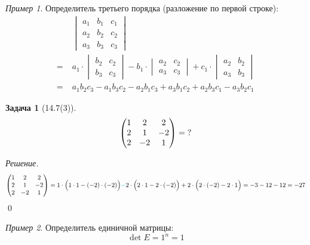 \documentclass[a4paper,12pt]{article}
\newtheorem*{problem}{Задача}
\theoremstyle{definition}
\theoremstyle{remark}
\newtheorem*{example}{Пример}
\theoremstyle{remark}
\begin{document}
  \begin{example}
    Определитель третьего порядка (разложение по первой строке):
    \begin{equation*}
    \begin{split}
      &\begin{vmatrix}
        a_1 & b_1 & c_1\\
        a_2 & b_2 & c_2\\
        a_3 & b_3 & c_3
      \end{vmatrix}\\
        =\; &a_1 \cdot \begin{vmatrix}b_2 & c_2\\b_3 & c_3\end{vmatrix}
        - b_1 \cdot \begin{vmatrix}a_2 & c_2\\a_3 & c_3\end{vmatrix}
        + c_1 \cdot \begin{vmatrix}a_2 & b_2\\a_3 & b_3\end{vmatrix}\\
        =\; &a_1 b_2 c_3 - a_1 b_3 c_2 - a_2 b_1 c_3 + a_3 b_1 c_2 + a_2 b_3 c_1 - a_3 b_2 c_1
    \end{split}
    \end{equation*}
  \end{example}
  
  \begin{problem}[14.7(3)]
    \[
      \begin{pmatrix}
        1 & 2 & 2\\
        2 & 1 & -2\\
        2 & -2 & 1
      \end{pmatrix} = \operatorname{?}
    \]
  \end{problem}
  
  \emph{Решение.}
  \[
    \begin{pmatrix}
      1 & 2 & 2\\
      2 & 1 & -2\\
      2 & -2 & 1
    \end{pmatrix}
    = 1 \cdot \Bigl(1 \cdot 1 - (-2) \cdot (-2)\Bigr)
      \textcolor{cyanL}{-} 2 \cdot \Bigl(2 \cdot 1 - 2 \cdot (-2)\Bigr)
      + 2 \cdot \Bigl(2 \cdot (-2) - 2 \cdot 1\Bigr)
    = -3 - 12 - 12
    = -27
  \]
  \qed
  
  \begin{example}
    Определитель единичной матрицы:
    \[
      \det E = 1^n = 1
    \]
  \end{example}
\end{document}
